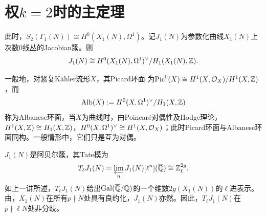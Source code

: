 \section{权\texorpdfstring{$k=2$}{k=2}时的主定理}\label{L8S3}
此时，$S_2(\Gamma_1(N))\cong H^0(X_1(N),\Omega^1)$。记$J_1(N)$为参数化曲线$X_1(N)$上次数0线丛的Jacobian簇。则
\[J_1(N)\cong H^0(X_1(N),\Omega^1)^\vee/H_1(X_1(N),\mathbb{Z}).\]
\begin{note}[L8S3O1]
一般地，对紧复Kähler流形$X$，其Picard环面
为$\operatorname{Pic}^0(X)\cong H^1(X,\mathcal O_X)/H^1(X,\mathbb{Z})$，而
\[\operatorname{Alb}(X):=H^0(X,\Omega^1)^\vee/H_1(X,\mathbb{Z})\]
称为Albanese环面，当$X$为曲线时，由Poincaré对偶性及Hodge理论，$H^1(X,\mathbb{Z})\cong H_1(X,\mathbb{Z})$，$H^0(X,\Omega^1)^\vee\cong H^1(X,\mathcal O_X)$；此时Picard环面与Albanese环面同构。一般情形中，它们只是互为对偶。
\end{note}
$J_1(N)$是阿贝尔簇，其Tate模为
\[T_\ell J_1(N)=\varprojlim_n J_1(N)[\ell^n](\overline{\mathbb{Q}})\cong\mathbb{Z}_\ell^{2g}.\]
如上一讲所述，$T_\ell J_1(N)$给出$\operatorname{Gal}(\overline{\mathbb{Q}}/\mathbb{Q})$的一个维数$2g(X_1(N))$的$\ell$进表示。由，$X_1(N)$在所有$p\nmid N$处具有良约化，$J_1(N)$亦然。因此，$T_\ell J_1(N)$在$p\nmid\ell N$处非分歧。

